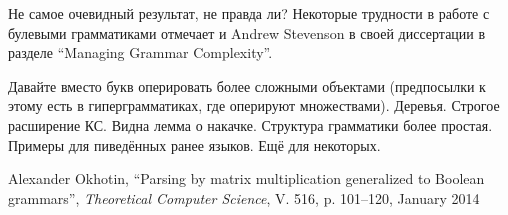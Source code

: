 \documentclass[12pt]{article}  %
\theoremstyle{definition}
\theoremstyle{remark}
\begin{document}
Не самое очевидный результат, не правда ли?
Некоторые трудности в работе с булевыми грамматиками отмечает и Andrew Stevenson в своей диссертации в разделе “Managing Grammar Complexity”. 

Давайте вместо букв оперировать более сложными объектами (предпосылки к этому есть в гиперграмматиках, где оперируют множествами). Деревья. 
Строгое расширение КС. Видна лемма о накачке. 
Структура грамматики более простая. Примеры для пиведённых ранее языков. Ещё для некоторых. 

\begin{thebibliography}{9}

  Alexander Okhotin,
  ``Parsing by matrix multiplication generalized to Boolean grammars'',
  \emph{Theoretical Computer Science},
  V. 516,
  p. 101--120,
  January 2014

\end{thebibliography}
\end{document}

